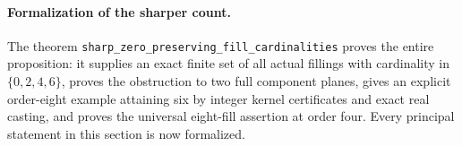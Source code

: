 \paragraph{Formalization of the sharper count.} The theorem \texttt{sharp\_\allowbreak zero\_\allowbreak preserving\_\allowbreak fill\_\allowbreak cardinalities} proves the entire proposition: it supplies an exact finite set of all actual fillings with cardinality in $\{0,2,4,6\}$, proves the obstruction to two full component planes, gives an explicit order-eight example attaining six by integer kernel certificates and exact real casting, and proves the universal eight-fill assertion at order four. Every principal statement in this section is now formalized.
